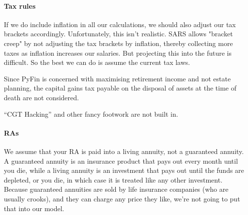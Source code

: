 \documentclass[a4paper, justified]{tufte-handout}
\begin{document}
\paragraph{Tax rules} \label{tax rules}
If we do include inflation in all our calculations, we should also adjust our tax brackets accordingly. Unfortunately, this isn't realistic. SARS allows "bracket creep" by not adjusting the tax brackets by inflation, thereby collecting more taxes as inflation increases our salaries. But projecting this into the future is difficult. So the best we can do is assume the current tax laws.

Since PyFin is concerned with maximising retirement income and not estate planning, the capital gains tax payable on the disposal of assets at the time of death are not considered.

``CGT Hacking'' and other fancy footwork are not built in.

\paragraph{RAs}
We assume that your RA is paid into a living annuity, not a guaranteed annuity. A guaranteed annuity is an insurance product that pays out every month until you die, while a living annuity is an investment that pays out until the funds are depleted, or you die, in which case it is treated like any other investment. Because guaranteed annuities are sold by life insurance companies (who are usually crooks), and they can charge any price they like, we're not going to put that into our model.
\end{document}
